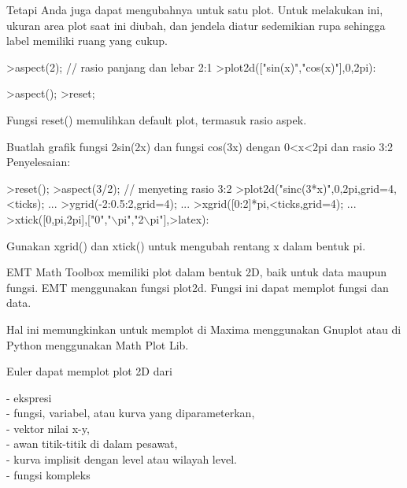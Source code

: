 \documentclass{article}
\begin{document}
\begin{eulernotebook}
\begin{eulercomment}
Tetapi Anda juga dapat mengubahnya untuk satu plot. Untuk melakukan
ini, ukuran area plot saat ini diubah, dan jendela diatur sedemikian
rupa sehingga label memiliki ruang yang cukup.
\end{eulercomment}
\begin{eulerprompt}
>aspect(2); // rasio panjang dan lebar 2:1
>plot2d(["sin(x)","cos(x)"],0,2pi):
\end{eulerprompt}
\begin{eulerprompt}
>aspect();
>reset;
\end{eulerprompt}
\begin{eulercomment}
Fungsi reset() memulihkan default plot, termasuk rasio aspek.\\
\end{eulercomment}
\eulersubheading{}
\begin{eulercomment}
Buatlah grafik fungsi 2sin(2x) dan fungsi cos(3x) dengan 0\textless{}x\textless{}2pi dan
rasio 3:2\\
Penyelesaian:
\end{eulercomment}
\begin{eulerprompt}
>reset();
>aspect(3/2); // menyeting rasio 3:2
>plot2d("sinc(3*x)",0,2pi,grid=4,<ticks); ...
>ygrid(-2:0.5:2,grid=4); ...
>xgrid([0:2]*pi,<ticks,grid=4);  ...
>xtick([0,pi,2pi],["0","\(\backslash\)pi","2\(\backslash\)pi"],>latex):
\end{eulerprompt}
\begin{eulercomment}
Gunakan xgrid() dan xtick() untuk mengubah rentang x dalam bentuk pi.
\end{eulercomment}
\begin{eulercomment}

\begin{eulercomment}
\begin{eulercomment}
EMT Math Toolbox memiliki plot dalam bentuk 2D, baik untuk data maupun
fungsi. EMT menggunakan fungsi plot2d. Fungsi ini dapat memplot fungsi
dan data.

Hal ini memungkinkan untuk memplot di Maxima menggunakan Gnuplot atau
di Python menggunakan Math Plot Lib.

Euler dapat memplot plot 2D dari

- ekspresi\\
- fungsi, variabel, atau kurva yang diparameterkan,\\
- vektor nilai x-y,\\
- awan titik-titik di dalam pesawat,\\
- kurva implisit dengan level atau wilayah level.\\
- fungsi kompleks


\end{eulercomment}
\end{eulercomment}
\end{eulercomment}
\end{eulernotebook}
\end{document}
